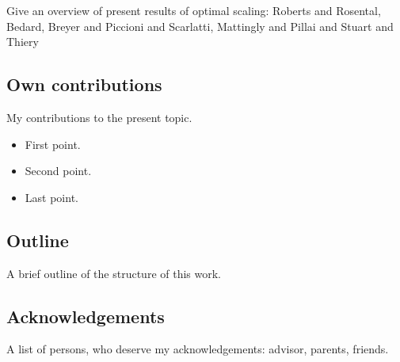 Give an overview of present results of optimal scaling: Roberts and Rosental, Bedard, Breyer and Piccioni and Scarlatti, Mattingly and Pillai and Stuart and Thiery

\subsection*{Own contributions}

My contributions to the present topic.
\begin{itemize}
 \item First point.
 \item Second point.
 \item Last point.
\end{itemize}


\subsection*{Outline}

A brief outline of the structure of this work.


\subsection*{Acknowledgements}

A list of persons, who deserve my acknowledgements: advisor, parents, friends.



